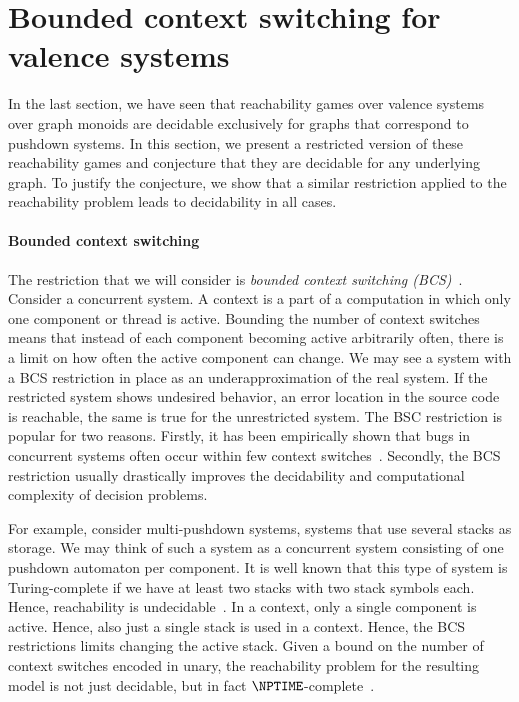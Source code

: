 \documentclass[../../diss.tex]{subfiles}
\begin{document}
\section{Bounded context switching for valence systems}%
\label{Section:ValenceBCS}%

In the last section, we have seen that reachability games over valence systems over graph monoids are decidable exclusively for graphs that correspond to pushdown systems.
In this section, we present a restricted version of these reachability games and conjecture that they are decidable for any underlying graph.
To justify the conjecture, we show that a similar restriction applied to the reachability problem leads to decidability in all cases.

\paragraph{Bounded context switching}

The restriction that we will consider is \emph{bounded context switching (BCS)}~\cite{QadeerR05}.
Consider a concurrent system.
A context is a part of a computation in which only one component or thread is active.
Bounding the number of context switches means that instead of each component becoming active arbitrarily often, there is a limit on how often the active component can change.
We may see a system with a BCS restriction in place as an underapproximation of the real system.
If the restricted system shows undesired behavior, \eg an error location in the source code is reachable, the same is true for the unrestricted system.
The BSC restriction is popular for two reasons.
Firstly, it has been empirically shown that bugs in concurrent systems often occur within few context switches~\cite{MusuvathiQ07,LuSSZ08}.
Secondly, the BCS restriction usually drastically improves the decidability and computational complexity of decision problems.

For example, consider multi-pushdown systems, systems that use several stacks as storage.
We may think of such a system as a concurrent system consisting of one pushdown automaton per component.
It is well known that this type of system is Turing-complete if we have at least two stacks with two stack symbols each.
Hence, reachability is undecidable~\cite{Ramalingam00}.
In a context, only a single component is active.
Hence, also just a single stack is used in a context.
Hence, the BCS restrictions limits changing the active stack.
Given a bound on the number of context switches encoded in unary, the reachability problem for the resulting model is not just decidable, but in fact $\NPTIME$-complete~\cite{QadeerR05}.
\end{document}
